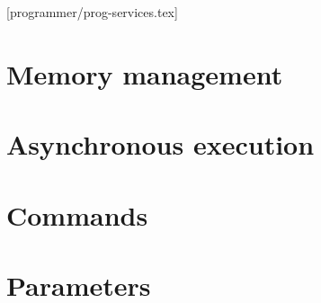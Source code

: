 [programmer/prog-services.tex]
\section{Memory management}
\section{Asynchronous execution}
\section{Commands}
\section{Parameters}
